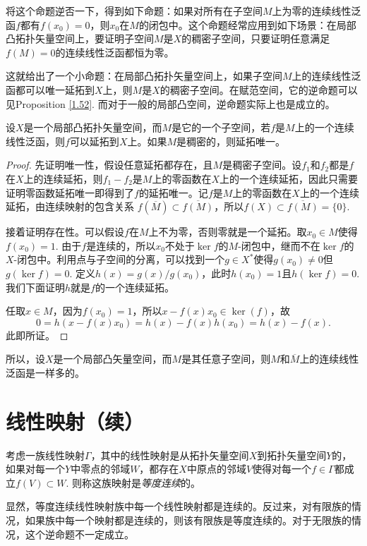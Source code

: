 将这个命题逆否一下，得到如下命题：如果对所有在子空间$M$上为零的连续线性泛函$f$都有$f(x_0)=0$，则$x_0$在$M$的闭包中。这个命题经常应用到如下场景：在局部凸拓扑矢量空间上，要证明子空间$M$是$X$的稠密子空间，只要证明任意满足$f(M)=0$的连续线性泛函都恒为零。

这就给出了一个小命题：在局部凸拓扑矢量空间上，如果子空间$M$上的连续线性泛函都可以唯一延拓到$X$上，则$M$是$X$的稠密子空间。在赋范空间，它的逆命题可以见Proposition \ref{1.52}. 而对于一般的局部凸空间，逆命题实际上也是成立的。

\begin{pro}
设$X$是一个局部凸拓扑矢量空间，而$M$是它的一个子空间，若$f$是$M$上的一个连续线性泛函，则$f$可以延拓到$X$上。如果$M$是稠密的，则延拓唯一。
\end{pro}

\begin{proof}
	先证明唯一性，假设任意延拓都存在，且$M$是稠密子空间。设$f_1$和$f_2$都是$f$在$X$上的连续延拓，则$f_1-f_2$是$M$上的零函数在$X$上的一个连续延拓，因此只需要证明零函数延拓唯一即得到了$f$的延拓唯一。记$f$是$M$上的零函数在$X$上的一个连续延拓，由连续映射的包含关系
	$f(\overline{M})\subset \overline{f(M)}$，所以$f(X)\subset\overline{f(M)}=\{0\}$.

	接着证明存在性。可以假设$f$在$M$上不为零，否则零就是一个延拓。取$x_0\in M$使得$f(x_0)=1$. 由于$f$是连续的，所以$x_0$不处于$\ker f$的$M$-闭包中，继而不在$\ker f$的$X$-闭包中。利用点与子空间的分离，可以找到一个$g\in X^*$使得$g(x_0)\neq 0$但$g(\ker f)=0$. 定义$h(x)=g(x)/g(x_0)$，此时$h(x_0)=1$且$h(\ker f)=0$. 我们下面证明$h$就是$f$的一个连续延拓。

	任取$x\in M$，因为$f(x_0)=1$，所以$x-f(x)x_0\in \ker(f)$，故
	\[
		0=h(x-f(x)x_0)=h(x)-f(x)h(x_0)=h(x)-f(x).
	\]
	此即所证。
\end{proof}

所以，设$X$是一个局部凸矢量空间，而$M$是其任意子空间，则$M$和$\overline{M}$上的连续线性泛函是一样多的。

\section{线性映射（续）}

\begin{para}
	考虑一族线性映射$\Gamma$，其中的线性映射是从拓扑矢量空间$X$到拓扑矢量空间$Y$的，如果对每一个$Y$中零点的邻域$W$，都存在$X$中原点的邻域$V$使得对每一个$f\in \Gamma$都成立$f(V)\subset W$. 则称这族映射是\textit{等度连续}的。

	显然，等度连续线性映射族中每一个线性映射都是连续的。反过来，对有限族的情况，如果族中每一个映射都是连续的，则该有限族是等度连续的。对于无限族的情况，这个逆命题不一定成立。
\end{para}

